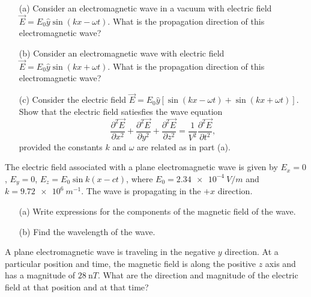 \documentclass[12pt,letterpaper,boxed,cm]{hmcpset}
\newcommand{\f}[2]{\frac{#1}{#2}}
\newcommand{\pn}[1]{\left( #1 \right)}
\begin{document}

\begin{problem}[SUP3]
	\begin{enumerate}
		\item[(a)] Consider an electromagnetic wave in a vacuum with electric field $\vec{E} = E_0\hat{y}\sin\pn{kx-\omega t}$. What is the propagation direction of this electromagnetic wave?
		\item[(b)] Consider an electromagnetic wave with electric field $\vec{E} = E_0\hat{y}\sin\pn{kx+\omega t}$. What is the propagation direction of this electromagnetic wave?
		\item[(c)] Consider the electric field $\vec{E} = E_0\hat{y} \left[\sin\pn{kx-\omega t} + \sin\pn{kx+\omega t}\right]$. Show that the electric field satiesfies the wave equation
		\[
				\f{\partial^2\vec{E}}{\partial x^2} + 
				\f{\partial^2\vec{E}}{\partial y^2} + 
				\f{\partial^2\vec{E}}{\partial z^2} = 
				\f{1}{V^2}
				\f{\partial^2\vec{E}}{\partial t^2},
		\]
		provided the constants $k$ and $\omega$ are related as in part (a).
	\end{enumerate}
\end{problem}
\begin{solution}
\end{solution}
\newpage

\begin{problem}[38-E16]
The electric field associated with a plane electromagnetic wave is given by $E_x = 0$, $E_y = 0$, $E_z = E_0\sin k\pn{x-ct}$, where $E_0 = \SI{2.34e-4}{V/m}$ and $k = \SI{9.72e6}{m^{-1}}$. The wave is propagating in the $+x$ direction.
\begin{enumerate}
	\item[(a)] Write expressions for the components of the magnetic field of the wave.
	\item[(b)] Find the wavelength of the wave.
\end{enumerate}
\end{problem}
\begin{solution}
\end{solution}
\newpage

\begin{problem}[38-E22]
A plane electromagnetic wave is traveling in the negative $y$ direction. At a particular position and time, the magnetic field is along the positive $z$ axis and has a magnitude of $\SI{28}{\nano T}$. What are the direction and magnitude of the electric field at that position and at that time?
\end{problem}
\begin{solution}
\end{solution}
\end{document}
